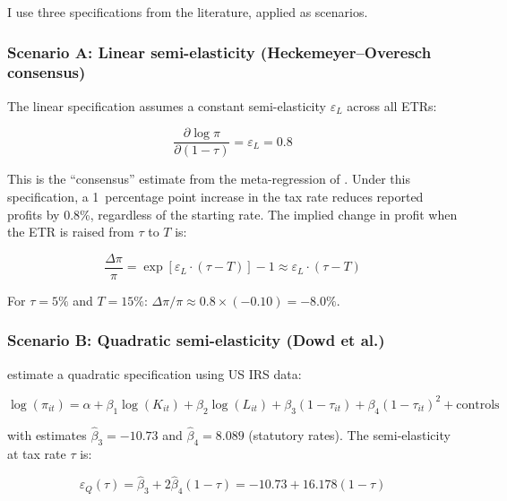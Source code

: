 \documentclass[11pt,a4paper]{article}
\begin{document}
I use three specifications from the literature, applied as scenarios.

\subsubsection{Scenario A: Linear semi-elasticity (Heckemeyer--Overesch consensus)}

The linear specification assumes a constant semi-elasticity $\varepsilon_L$ across all ETRs:

\begin{equation}\label{eq:linear_se}
\frac{\partial \log \pi}{\partial (1-\tau)} = \varepsilon_L = 0.8
\end{equation}

This is the ``consensus'' estimate from the meta-regression of \citet{heckemeyer2017}. Under this specification, a 1~percentage point increase in the tax rate reduces reported profits by 0.8\%, regardless of the starting rate. The implied change in profit when the ETR is raised from $\tau$ to $T$ is:

\begin{equation}\label{eq:linear_response}
\frac{\Delta \pi}{\pi} = \exp\!\left[\varepsilon_L \cdot (\tau - T)\right] - 1 \approx \varepsilon_L \cdot (\tau - T)
\end{equation}

For $\tau = 5\%$ and $T = 15\%$: $\Delta\pi/\pi \approx 0.8 \times (-0.10) = -8.0\%$.

\subsubsection{Scenario B: Quadratic semi-elasticity (Dowd et al.)}

\citet{dowd2017} estimate a quadratic specification using US IRS data:

\begin{equation}\label{eq:dowd_spec}
\log(\pi_{it}) = \alpha + \beta_1 \log(K_{it}) + \beta_2 \log(L_{it}) + \beta_3 (1-\tau_{it}) + \beta_4 (1-\tau_{it})^2 + \text{controls}
\end{equation}

with estimates $\hat{\beta}_3 = -10.73$ and $\hat{\beta}_4 = 8.089$ (statutory rates). The semi-elasticity at tax rate $\tau$ is:

\begin{equation}\label{eq:dowd_se}
\varepsilon_Q(\tau) = \hat{\beta}_3 + 2\hat{\beta}_4 (1-\tau) = -10.73 + 16.178(1-\tau)
\end{equation}
\end{document}
